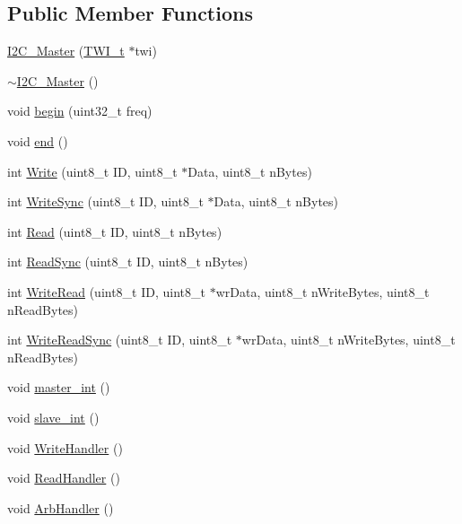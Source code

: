\subsection*{Public Member Functions}
\begin{DoxyCompactItemize}
\item 
\hyperlink{class_i2_c___master_a6d45344a3c34e58da098283992adcab8}{I2C\_\-Master} (\hyperlink{struct_t_w_i__struct}{TWI\_\-t} $\ast$twi)
\item 
\hyperlink{class_i2_c___master_aa02eab973159049903e056283c5fba90}{$\sim$I2C\_\-Master} ()
\item 
void \hyperlink{class_i2_c___master_a4e6323d0c9dc60723d850c3783008319}{begin} (uint32\_\-t freq)
\item 
void \hyperlink{class_i2_c___master_a6a2768a5a33d3186d263e1e11468e023}{end} ()
\item 
int \hyperlink{class_i2_c___master_a843137596436601c2b504cd42f9542e3}{Write} (uint8\_\-t ID, uint8\_\-t $\ast$Data, uint8\_\-t nBytes)
\item 
int \hyperlink{class_i2_c___master_ad2b29c2c12ec81aacf953a4ed5a88fc5}{WriteSync} (uint8\_\-t ID, uint8\_\-t $\ast$Data, uint8\_\-t nBytes)
\item 
int \hyperlink{class_i2_c___master_a49a2ffdc0b3e5f4893ca6239a72a91ef}{Read} (uint8\_\-t ID, uint8\_\-t nBytes)
\item 
int \hyperlink{class_i2_c___master_a7a065f18c4879991e3296e3f395dc091}{ReadSync} (uint8\_\-t ID, uint8\_\-t nBytes)
\item 
int \hyperlink{class_i2_c___master_a93a751d52078aa83c5c45286e9083124}{WriteRead} (uint8\_\-t ID, uint8\_\-t $\ast$wrData, uint8\_\-t nWriteBytes, uint8\_\-t nReadBytes)
\item 
int \hyperlink{class_i2_c___master_ad154a78a6027048c0a63406ce38ec59b}{WriteReadSync} (uint8\_\-t ID, uint8\_\-t $\ast$wrData, uint8\_\-t nWriteBytes, uint8\_\-t nReadBytes)
\item 
void \hyperlink{class_i2_c___master_a6ed9c2eb68a0a17e5bf2d44a1f3fe3a8}{master\_\-int} ()
\item 
void \hyperlink{class_i2_c___master_ad651f27948fadda68b817cc309bd347e}{slave\_\-int} ()
\item 
void \hyperlink{class_i2_c___master_a6f98d7fb1d99f496e839e5d5f3c319d0}{WriteHandler} ()
\item 
void \hyperlink{class_i2_c___master_ae1bd396452977a2edb841fa6f84919a7}{ReadHandler} ()
\item 
void \hyperlink{class_i2_c___master_a83f7567e7c6b76c022b780e96396a844}{ArbHandler} ()

\end{DoxyCompactItemize}
